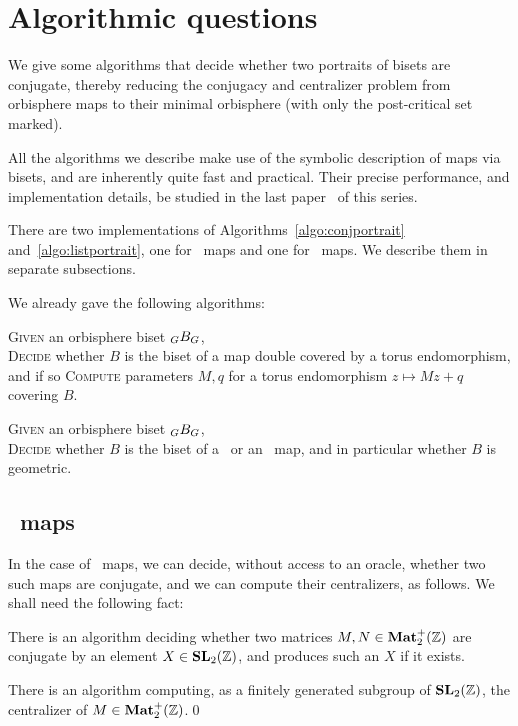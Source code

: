 \documentclass{amsart}
\begin{document}
\section{Algorithmic questions}
We give some algorithms that decide whether two portraits of bisets
are conjugate, thereby reducing the conjugacy and centralizer problem
from orbisphere maps to their minimal orbisphere (with only the
post-critical set marked).

All the algorithms we describe make use of the symbolic description of
maps via bisets, and are inherently quite fast and practical. Their
precise performance, and implementation details, be studied in the
last paper~\cite{bartholdi-dudko:bc5} of this series.

There are two implementations of Algorithms~\ref{algo:conjportrait}
and~\ref{algo:listportrait}, one for \Tor\ maps and one for \Exp\
maps. We describe them in separate subsections.

We already gave the following algorithms:
\begin{algo}\label{algo:2222}
  \textsc{Given} an orbisphere biset $\subscript G B_G$,\\
  \textsc{Decide} whether $B$ is the biset of a map double covered by
  a torus endomorphism, and if so \textsc{Compute} parameters $M,q$ for a torus endomorphism $z\mapsto M z+q$ covering $B$.
\end{algo}

\begin{algo}[\cite{bartholdi-dudko:bc4}*{Algorithms~\ref{bc4:algo:istor} and~\ref{bc4:algo:isexp}}]\label{algo:geom}
  \textsc{Given} an orbisphere biset $\subscript G B_G$,\\
  \textsc{Decide} whether $B$ is the biset of a \Tor\ or an \Exp\ map, and in particular whether $B$ is geometric.
\end{algo}

\subsection{\Tor\ maps}
In the case of \Tor\ maps, we can decide, without access to an oracle,
whether two such maps are conjugate, and we can compute their
centralizers, as follows. We shall need the following fact:
\begin{thm}\label{thm:MatrConj}
  There is an algorithm deciding whether two matrices
  $M,N\in \mathbf{Mat}_2^+({\mathbb Z})$ are conjugate by an element $X\in \mathbf{SL}_2({\mathbb Z})$,
  and produces such an $X$ if it exists.

  There is an algorithm computing, as a finitely generated subgroup of
  $\mathbf{SL}_2({\mathbb Z})$, the centralizer of $M\in \mathbf{Mat}_2^+({\mathbb Z})$.\qed
\end{thm}
\end{document}
